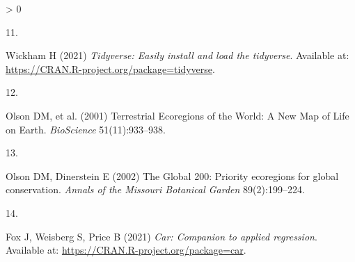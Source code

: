 \documentclass[9pt,lineno]{pnas-new}
\newlength{\csllabelwidth}
\newlength{\cslhangindent}
\newenvironment{CSLReferences}[2] %
 {%
  \setlength{\parindent}{0pt}
  \ifodd #1 \everypar{\setlength{\hangindent}{\cslhangindent}}\ignorespaces\fi
  \ifnum #2 > 0
  \setlength{\parskip}{#2\baselineskip}
  \fi
 }%
 {}
\newcommand{\CSLLeftMargin}[1]{\parbox[t]{\csllabelwidth}{#1}}
\newcommand{\CSLRightInline}[1]{\parbox[t]{\linewidth - \csllabelwidth}{#1}\break}
\begin{document}
\begin{CSLReferences}{0}{0}
\leavevmode\hypertarget{ref-R-tidyverse}{}%
\CSLLeftMargin{11. }
\CSLRightInline{Wickham H (2021) \emph{Tidyverse: Easily install and load the tidyverse}. Available at: \url{https://CRAN.R-project.org/package=tidyverse}.}

\leavevmode\hypertarget{ref-Olson2001}{}%
\CSLLeftMargin{12. }
\CSLRightInline{Olson DM, et al. (2001) {Terrestrial Ecoregions of the World: A New Map of Life on Earth}. \emph{BioScience} 51(11):933--938.}

\leavevmode\hypertarget{ref-Olson2002}{}%
\CSLLeftMargin{13. }
\CSLRightInline{Olson DM, Dinerstein E (2002) {The Global 200: Priority ecoregions for global conservation}. \emph{Annals of the Missouri Botanical Garden} 89(2):199--224.}

\leavevmode\hypertarget{ref-R-car}{}%
\CSLLeftMargin{14. }
\CSLRightInline{Fox J, Weisberg S, Price B (2021) \emph{Car: Companion to applied regression}. Available at: \url{https://CRAN.R-project.org/package=car}.}

\end{CSLReferences}



% 
\end{document}
